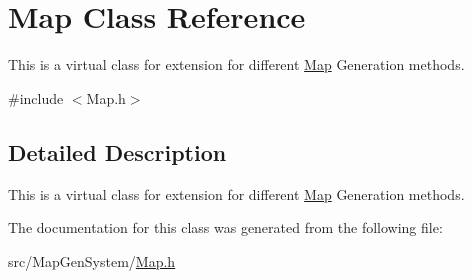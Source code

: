 \hypertarget{class_map}{}\section{Map Class Reference}
\label{class_map}


This is a virtual class for extension for different \mbox{\hyperlink{class_map}{Map}} Generation methods.  




{\ttfamily \#include $<$Map.\+h$>$}



\subsection{Detailed Description}
This is a virtual class for extension for different \mbox{\hyperlink{class_map}{Map}} Generation methods. 

The documentation for this class was generated from the following file\+:\begin{DoxyCompactItemize}
\item 
src/\+Map\+Gen\+System/\mbox{\hyperlink{_map_8h}{Map.\+h}}\end{DoxyCompactItemize}
